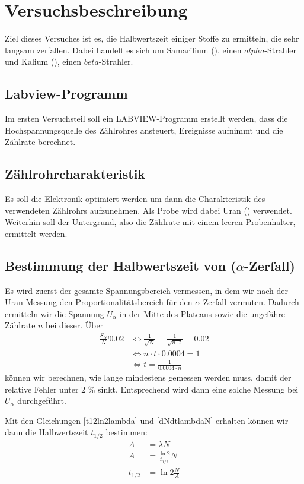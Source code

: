 \section{Versuchsbeschreibung}

Ziel dieses Versuches ist es, die Halbwertszeit einiger Stoffe zu ermitteln, die sehr langsam zerfallen. Dabei handelt es sich um Samarilium (), einen $alpha$-Strahler und Kalium (), einen $beta$-Strahler.

\subsection{Labview-Programm}
Im ersten Versuchsteil soll ein LABVIEW-Programm erstellt werden, dass die Hochspannungsquelle des Zählrohres ansteuert, Ereignisse aufnimmt und die Zählrate berechnet.

\subsection{Zählrohrcharakteristik}
Es soll die Elektronik optimiert werden um dann die Charakteristik des verwendeten Zählrohrs aufzunehmen. Als Probe wird dabei Uran () verwendet. Weiterhin soll der Untergrund, also die Zählrate mit einem leeren Probenhalter, ermittelt werden.

\subsection{Bestimmung der Halbwertszeit von  ($\alpha$-Zerfall)}
Es wird zuerst der gesamte Spannungsbereich vermessen, in dem wir nach der Uran-Messung den Proportionalitätsbereich für den $\alpha$-Zerfall vermuten. Dadurch ermitteln wir die Spannung $U_{\alpha}$ in der Mitte des Plateaus sowie die ungefähre Zählrate $n$ bei dieser. Über
\begin{align}
 \frac{S_N}{N} \stackrel{!}{} 0.02 & \Leftrightarrow \frac{1}{\sqrt{N}} = \frac{1}{\sqrt{n \cdot t}} = 0.02 \\
				   & \Leftrightarrow n \cdot t \cdot 0.0004 = 1 \\
				   & \Leftrightarrow t = \frac{1}{0.0004 \cdot n} \label{zeitfuerkleinenfehler}
\end{align}
können wir berechnen, wie lange mindestens gemessen werden muss, damit der relative Fehler unter 2 \% sinkt. Entsprechend wird dann eine solche Messung bei $U_{\alpha}$ durchgeführt.

Mit den Gleichungen \ref{t12ln2lambda} und \ref{dNdtlambdaN} erhalten können wir dann die Halbwertszeit $t_{1/2}$ bestimmen:
\begin{align}
 A & = \lambda N \\
 A & = \frac{\ln 2}{t_{1/2}}N \\
 t_{1/2} & = \ln 2 \frac{N}{A}
\end{align}

